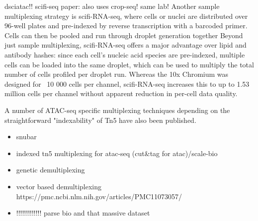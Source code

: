dsciatac!!
scifi-seq paper: also uses crop-seq! same lab!
Another sample multiplexing strategy is scifi-RNA-seq, where cells or nuclei are distributed over 96-well plates and pre-indexed by reverse transcription with a barcoded primer. Cells can then be pooled and run through droplet generation together Beyond just sample multiplexing, scifi-RNA-seq offers a major advantage over lipid and antibody hashes: since each cell's nucleic acid species are pre-indexed, multiple cells can be loaded into the same droplet, which can be used to multiply the total number of cells profiled per droplet run. Whereas the 10x Chromium was designed for ~10 000 cells per channel, scifi-RNA-seq increases this to up to 1.53 million cells per channel without apparent reduction in per-cell data quality.

A number of ATAC-seq specific multiplexing techniques depending on the straightforward "indexability" of Tn5 have also been published.

\begin{itemize}
    \item snubar
    \item indexed tn5 multiplexing for atac-seq (cut\&tag for atac)/scale-bio
    \item genetic demultiplexing
    \item vector based demultiplexing https://pmc.ncbi.nlm.nih.gov/articles/PMC11073057/
    \item !!!!!!!!!!!!! parse bio and that massive dataset
\end{itemize}

